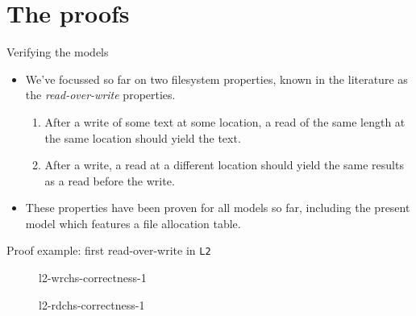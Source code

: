 \documentclass{beamer}
\begin{document}
\section{The proofs}

\begin{frame}{Verifying the models}
  \begin{itemize}
  \item We've focussed so far on two filesystem properties, known in
    the literature as the \textit{read-over-write} properties.
    \begin{enumerate}
    \item After a write of some text at some location, a read of the
      same length at the same location should yield the text.
    \item After a write, a read at a different location should yield
      the same results as a read before the write.
    \end{enumerate}
  \item These properties have been proven for all models so far,
    including the present model which features a file allocation
    table.
  \end{itemize}
\end{frame}

\begin{frame}{Proof example: first read-over-write in \texttt{L2}}
  \begin{figure}
    \caption{l2-wrchs-correctness-1}
  \end{figure}
  \begin{figure}
    \caption{l2-rdchs-correctness-1}
  \end{figure}
\end{frame}
\end{document}
